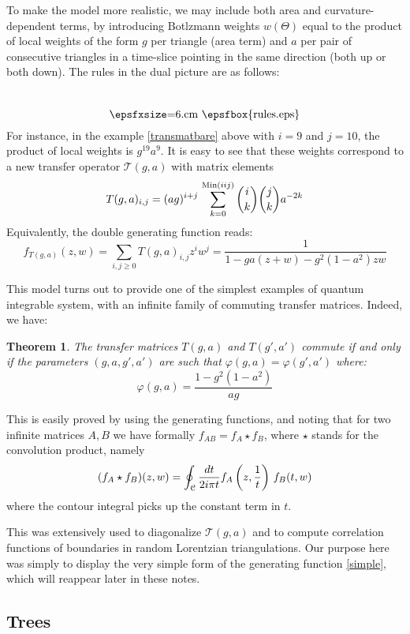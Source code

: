 \documentclass[12pt]{amsart}
\newtheorem{thm}{Theorem}[section]
\numberwithin{equation}{section}
\begin{document}
To make the model more realistic, we may include both area and curvature-dependent terms, by introducing
Botlzmann weights $w(\Theta)$ equal to the product of local weights of the form $g$ per triangle (area term)
and $a$ per pair of consecutive triangles in a time-slice pointing in the same direction (both up or both down).
The rules in the dual picture are as follows:
$$\raisebox{-1.cm}{\hbox{\epsfxsize=6.cm \epsfbox{rules.eps}}}   $$
For instance, in the example \eqref{transmatbare} above with $i=9$ and $j=10$, the product of local weights is $g^{19} a^{9}$.
It is easy to see that these weights correspond to a new transfer operator ${\mathcal T}(g,a)$ with
matrix elements 
$$T(g,a)_{i,j}= (ag)^{i+j}\, \sum_{k=0}^{{\rm Min}(iij)} {i\choose k}{j\choose k} a^{-2k} $$
Equivalently, the double generating function reads:
\begin{equation}\label{simple} f_{T(g,a)}(z,w)=\sum_{i,j\geq 0} T(g,a)_{i,j} z^i w^j =\frac{1}{1-ga(z+w)-g^2(1-a^2)z w} 
\end{equation}

This model turns out to provide one of the simplest examples of quantum integrable system, with an infinite
family of commuting transfer matrices. Indeed, we have:

\begin{thm}\cite{LORGRA}
The transfer matrices $T(g,a)$ and $T(g',a')$ commute if and only if the parameters $(g,a,g',a')$ are such that
$\varphi(g,a)=\varphi(g',a')$ where:
$$ \varphi(g,a)=\frac{1-g^2(1-a^2)}{a g} $$
\end{thm}

This is easily proved by using the generating functions, and noting that for two infinite matrices $A,B$
we have formally $f_{AB}=f_A\star f_B$, where $\star$ stands for the convolution product, namely
$$ (f_A \star f_B) (z,w)=\oint_{\mathcal C} {dt \over 2i\pi t} f_A\left(z,\frac{1}{t}\right)\, f_B(t, w) $$
where the contour integral picks up the constant term in $t$.

This was extensively used\cite{LORGRA} to diagonalize ${\mathcal T}(g,a)$ and to compute correlation
functions of boundaries in random Lorentzian triangulations. Our purpose here was simply to display the very
simple form of the generating function \eqref{simple}, which will reappear later in these notes.

\subsection{Trees}
\end{document}
